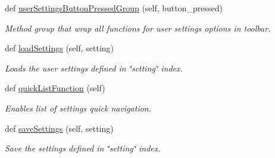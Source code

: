 \begin{DoxyCompactItemize}
def \hyperlink{classbladepro__modules_1_1inputfile__writer_1_1_input_writer_window_a1b508dd4cb9c699a1769e7727d1e6fc1}{user\+Settings\+Button\+Pressed\+Group} (self, button\+\_\+pressed)
\begin{DoxyCompactList}\small\item\em Method group that wrap all functions for user settings options in toolbar. \end{DoxyCompactList}\item 
def \hyperlink{classbladepro__modules_1_1inputfile__writer_1_1_input_writer_window_a0c4f30850537553db0ff2e27059733a4}{load\+Settings} (self, setting)
\begin{DoxyCompactList}\small\item\em Loads the user settings defined in \char`\"{}setting\char`\"{} index. \end{DoxyCompactList}\item 
def \hyperlink{classbladepro__modules_1_1inputfile__writer_1_1_input_writer_window_a0e71786a8b6fe43e6a01ff388c34ce18}{quick\+List\+Function} (self)
\begin{DoxyCompactList}\small\item\em Enables list of settings quick navigation. \end{DoxyCompactList}\item 
def \hyperlink{classbladepro__modules_1_1inputfile__writer_1_1_input_writer_window_a723573fade09f206a9c89569885558c1}{save\+Settings} (self, setting)
\begin{DoxyCompactList}\small\item\em Save the settings defined in \char`\"{}setting\char`\"{} index. \end{DoxyCompactList}\end{DoxyCompactItemize}
